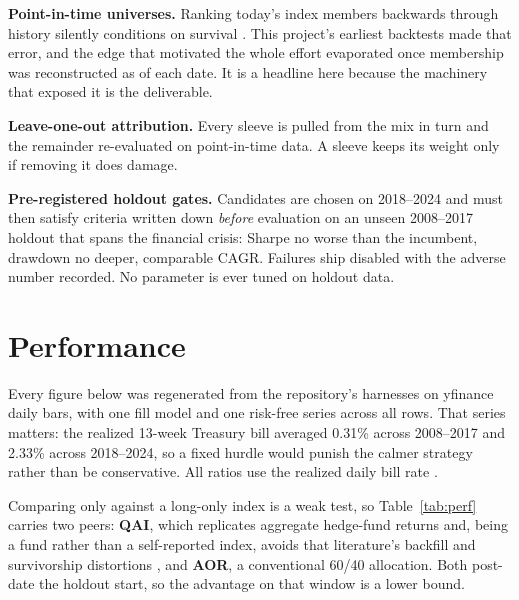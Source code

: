 \documentclass[conference]{IEEEtran}
\begin{document}
\textbf{Point-in-time universes.} Ranking today's index members backwards
through history silently conditions on survival \cite{shumway1997delisting}.
This project's earliest backtests made that error, and the edge that motivated
the whole effort evaporated once membership was reconstructed as of each date.
It is a headline here because the machinery that exposed it is the deliverable.

\textbf{Leave-one-out attribution.} Every sleeve is pulled from the mix in turn
and the remainder re-evaluated on point-in-time data. A sleeve keeps its weight
only if removing it does damage.

\textbf{Pre-registered holdout gates.} Candidates are chosen on 2018--2024 and
must then satisfy criteria written down \emph{before} evaluation on an unseen
2008--2017 holdout that spans the financial crisis: Sharpe no worse than the
incumbent, drawdown no deeper, comparable CAGR. Failures ship disabled with the
adverse number recorded. No parameter is ever tuned on holdout data.

\section{Performance}
\label{sec:eval}

Every figure below was regenerated from the repository's harnesses on yfinance
daily bars, with one fill model and one risk-free series across all rows. That
series matters: the realized 13-week Treasury bill averaged 0.31\% across
2008--2017 and 2.33\% across 2018--2024, so a fixed hurdle would punish the
calmer strategy rather than be conservative. All ratios use the realized daily
bill rate \cite{sharpe1994}.

Comparing only against a long-only index is a weak test, so
Table~\ref{tab:perf} carries two peers: \textbf{QAI}, which replicates
aggregate hedge-fund returns and, being a fund rather than a self-reported
index, avoids that literature's backfill and survivorship distortions
\cite{fung2000performance}, and \textbf{AOR}, a conventional 60/40 allocation.
Both post-date the holdout start, so the advantage on that window is a lower
bound.
\end{document}
